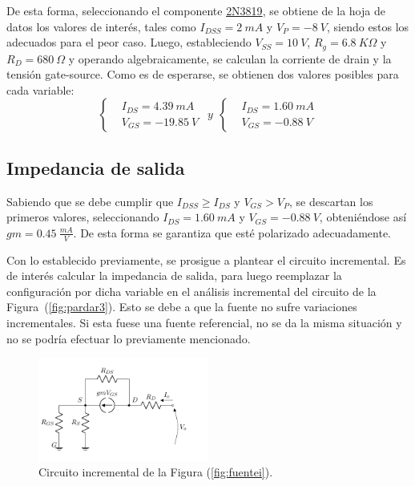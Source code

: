De esta forma, seleccionando el componente \href{https://www.onsemi.com/pub/Collateral/2N3819-D.PDF}{2N3819}, se obtiene de la hoja de datos los valores de interés, tales como $I_{DSS} = 2 \ mA$ y $V_P = -8 \ V$, siendo estos los adecuados para el peor caso. Luego, estableciendo $V_{SS} = 10 \ V$, $R_g = 6.8 \ K\Omega$ y $R_D = 680 \ \Omega$ y operando algebraicamente, se calculan la corriente de drain y la tensión gate-source. Como es de esperarse, se obtienen dos valores posibles para cada variable:
\begin{equation*}
\left\lbrace
\begin{split}
	&I_{DS} =  4.39 \ mA \\
	&V_{GS} =  -19.85 \ V
\end{split}
\right.
\ \ y \ \
\left\lbrace
\begin{split}
	&I_{DS} =  1.60 \ mA \\
	&V_{GS} =  -0.88 \ V
\end{split}
\right.
\end{equation*}

\subsection{Impedancia de salida}
Sabiendo que se debe cumplir que $I_{DSS} \geq I_{DS}$ y $V_{GS} > V_{P}$, se descartan los primeros valores, seleccionando $I_{DS} = 1.60 \ mA$ y $V_{GS} = -0.88 \ V$, obteniéndose así $gm = 0.45 \ \frac{mA}{V}$. De esta forma se garantiza que esté polarizado adecuadamente.

Con lo establecido previamente, se prosigue a plantear el circuito incremental. Es de interés calcular la impedancia de salida, para luego reemplazar la configuración por dicha variable en el análisis incremental del circuito de la Figura~(\ref{fig:pardar3}). Esto se debe a que la fuente no sufre variaciones incrementales. Si esta fuese una fuente referencial, no se da la misma situación y no se podría efectuar lo previamente mencionado.
\begin{figure}[H]
\centering
	\includegraphics[width=0.5\textwidth, page=1]{Imagenes/ModeloIncremental.pdf}
	\caption{Circuito incremental de la Figura (\ref{fig:fuentei}).}
\label{fig:incfuente1}
\end{figure}

